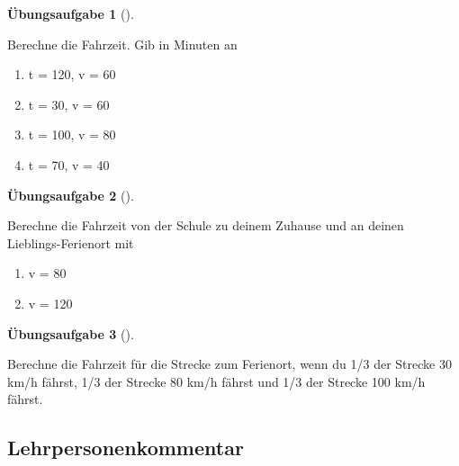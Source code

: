 \documentclass[
  10pt,
  a4paper,
  DIV=11]{scrartcl}
\providecommand{\tightlist}{%
  \setlength{\itemsep}{0pt}\setlength{\parskip}{0pt}}\usepackage{longtable,booktabs,array}
\theoremstyle{definition}
\newtheorem{exercise}{Übungsaufgabe}[section]
\theoremstyle{remark}
\begin{document}
\begin{exercise}[]\protect\hypertarget{exr-line}{}\label{exr-line}

Berechne die Fahrzeit. Gib in Minuten an

\begin{enumerate}
\def\labelenumi{\arabic{enumi}.}
\tightlist
\item
  t = 120, v = 60
\item
  t = 30, v = 60
\item
  t = 100, v = 80
\item
  t = 70, v = 40
\end{enumerate}

\end{exercise}

\begin{exercise}[]\protect\hypertarget{exr-line}{}\label{exr-line}

Berechne die Fahrzeit von der Schule zu deinem Zuhause und an deinen
Lieblings-Ferienort mit

\begin{enumerate}
\def\labelenumi{\arabic{enumi}.}
\tightlist
\item
  v = 80
\item
  v = 120
\end{enumerate}

\end{exercise}

\begin{exercise}[]\protect\hypertarget{exr-line}{}\label{exr-line}

Berechne die Fahrzeit für die Strecke zum Ferienort, wenn du 1/3 der
Strecke 30 km/h fährst, 1/3 der Strecke 80 km/h fährst und 1/3 der
Strecke 100 km/h fährst.

\end{exercise}

\subsection{Lehrpersonenkommentar}\label{lehrpersonenkommentar}
\end{document}

